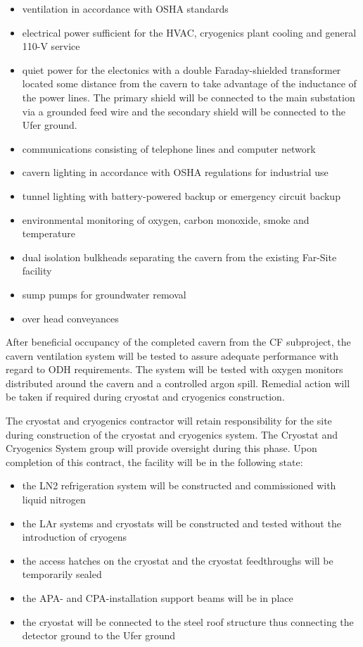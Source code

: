 \begin{itemize}
\item ventilation in accordance with OSHA standards
\item electrical power sufficient for the HVAC, cryogenics plant cooling and general 110-V service
\item quiet power for the electonics with a double Faraday-shielded transformer located some distance from the cavern to take advantage of the inductance of the power lines. The primary shield will be connected to the main substation via a grounded feed wire and the secondary shield will be connected to the Ufer ground.
\item communications consisting of telephone lines and computer network
\item cavern lighting in accordance with OSHA regulations for industrial use
\item tunnel lighting with battery-powered backup or emergency circuit backup
\item environmental monitoring of oxygen, carbon monoxide, smoke and temperature
\item dual isolation bulkheads separating the cavern from the existing Far-Site facility
\item sump pumps for groundwater removal
\item over head conveyances
\end{itemize}

After beneficial occupancy of the completed cavern from the 
CF subproject, the cavern ventilation system will be tested to assure adequate performance with regard to ODH requirements. The system will be tested with oxygen monitors distributed around the cavern and a controlled argon spill. Remedial action will be taken if required during cryostat and cryogenics construction.

The cryostat and cryogenics contractor will retain responsibility for the site during construction of the cryostat and cryogenics system. The Cryostat and Cryogenics System group will provide oversight during this phase. Upon completion of this contract, the facility will be in the following state:

\begin{itemize}
\item the LN2 refrigeration system will be constructed and commissioned with liquid nitrogen
\item the LAr systems and cryostats will be constructed and tested without the introduction of cryogens \item the access hatches on the cryostat and the cryostat feedthroughs will be temporarily sealed
\item the APA- and CPA-installation support beams will be in place
\item the cryostat will be connected to the steel roof structure thus connecting the detector ground to the Ufer ground
\end{itemize}

